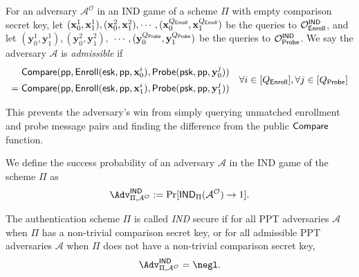 \begin{definition}
\label{def:admissible}
	For an adversary $\mathcal{A}^\mathcal{O}$ in an IND game of a scheme $\Pi$ with empty comparison secret key, let $(\mathbf{x}_0^1, \mathbf{x}_1^1), (\mathbf{x}_0^2, \mathbf{x}_1^2), \cdots, (\mathbf{x}_0^{Q_{\sf Enroll}}, \mathbf{x}_1^{Q_{\sf Enroll}})$ be the queries to $\mathcal{O}_{\sf Enroll}^{\sf IND}$, and let $(\mathbf{y}_0^1, \mathbf{y}_1^1), (\mathbf{y}_0^2, \mathbf{y}_1^2),$ $\cdots, (\mathbf{y}_0^{Q_{\sf Probe}}, \mathbf{y}_1^{Q_{\sf Probe}})$ be the queries to $\mathcal{O}_{\sf Probe}^{\sf IND}$. We say the adversary $\mathcal{A}$ is \emph{admissible} if
	\[
		\begin{aligned}
			& {\sf Compare}( {\sf pp}, {\sf Enroll}({\sf esk}, {\sf pp}, \mathbf{x}_0^i), {\sf Probe}({\sf psk}, {\sf pp}, \mathbf{y}_0^j) ) \\
			= \; & {\sf Compare}( {\sf pp}, {\sf Enroll}({\sf esk}, {\sf pp}, \mathbf{x}_1^i), {\sf Probe}({\sf psk}, {\sf pp}, \mathbf{y}_1^j) )
		\end{aligned}
		\quad \forall i \in [Q_{\sf Enroll}], \forall j \in [Q_{\sf Probe}]
	\]
	

\end{definition}

This prevents the adversary's win from simply querying unmatched enrollment and probe message pairs and finding the difference from the public $\sf Compare$ function.

We define the success probability of an adversary $\mathcal{A}$ in the IND game of the scheme $\Pi$ as
\[
	\Adv^{\sf IND}_{\Pi, \mathcal{A}^\mathcal{O}} := \Pr[{\sf IND}_{\Pi}(\mathcal{A}^\mathcal{O}) \to 1].
\]

The authentication scheme $\Pi$ is called \emph{IND} secure if for all PPT adversaries $\mathcal{A}$ when $\Pi$ has a non-trivial comparison secret key, or for all admissible PPT adversaries $\mathcal{A}$ when $\Pi$ does not have a non-trivial comparison secret key,
\[
	\Adv^{\sf IND}_{\Pi, \mathcal{A^\mathcal{O}}} = \negl.
\]

